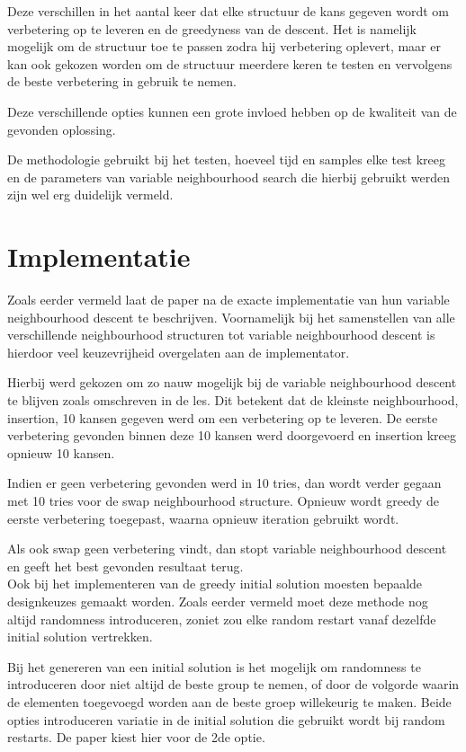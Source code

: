 \documentclass[pdftex,12pt,a4paper]{article}
\begin{document}
Deze verschillen in het aantal keer dat elke structuur de kans gegeven wordt om verbetering op te leveren en de greedyness van de descent. Het is namelijk mogelijk om de structuur toe te passen zodra hij verbetering oplevert, maar er kan ook gekozen worden om de structuur meerdere keren te testen en vervolgens de beste verbetering in gebruik te nemen.

Deze verschillende opties kunnen een grote invloed hebben op de kwaliteit van de gevonden oplossing.

De methodologie gebruikt bij het testen, hoeveel tijd en samples elke test kreeg en de parameters van variable neighbourhood search die hierbij gebruikt werden zijn wel erg duidelijk vermeld.

\section{Implementatie}
Zoals eerder vermeld laat de paper na de exacte implementatie van hun variable neighbourhood descent te beschrijven. Voornamelijk bij het samenstellen van alle verschillende neighbourhood structuren tot variable neighbourhood descent is hierdoor veel keuzevrijheid overgelaten aan de implementator.

Hierbij werd gekozen om zo nauw mogelijk bij de variable neighbourhood descent te blijven zoals omschreven in de les. Dit betekent dat de kleinste neighbourhood, insertion, 10 kansen gegeven werd om een verbetering op te leveren.
De eerste verbetering gevonden binnen deze 10 kansen werd doorgevoerd en insertion kreeg opnieuw 10 kansen.

Indien er geen verbetering gevonden werd in 10 tries, dan wordt verder gegaan met 10 tries voor de swap neighbourhood structure. Opnieuw wordt greedy de eerste verbetering toegepast, waarna opnieuw iteration gebruikt wordt.

Als ook swap geen verbetering vindt, dan stopt variable neighbourhood descent en geeft het best gevonden resultaat terug.
\\[1em]
Ook bij het implementeren van de greedy initial solution moesten bepaalde designkeuzes gemaakt worden. Zoals eerder vermeld moet deze methode nog altijd randomness introduceren, zoniet zou elke random restart vanaf dezelfde initial solution vertrekken.

Bij het genereren van een initial solution is het mogelijk om randomness te introduceren door niet altijd de beste group te nemen, of door de volgorde waarin de elementen toegevoegd worden aan de beste groep willekeurig te maken. Beide opties introduceren variatie in de initial solution die gebruikt wordt bij random restarts. De paper kiest hier voor de 2de optie.
\end{document}
